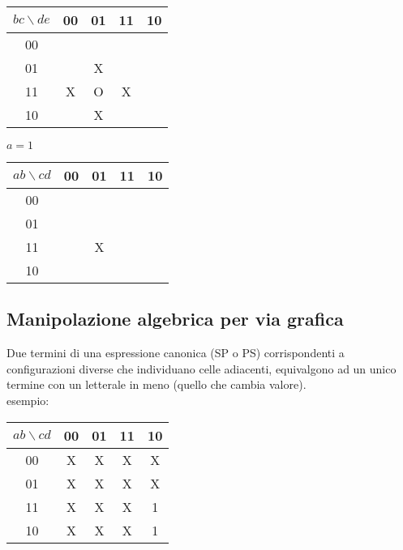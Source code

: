 \documentclass{subfiles}
\begin{document}
\begin{itemize}
    \begin{center}
    \begin{tabular}{ |c|c|c|c|c| }
    \hline
    $bc \backslash de$ & 00 & 01 & 11 & 10 \\
    \hline
    \hline
    00 & & & & \\
    01 & & X & & \\
    11 & X & O & X & \\
    10 & & X & & \\
    \hline
    \end{tabular}
    \end{center}

    $a=1$

    \begin{center}
    \begin{tabular}{ |c|c|c|c|c| }
    \hline
    $ab \backslash cd$ & 00 & 01 & 11 & 10 \\
    \hline
    \hline
    00 & & & & \\
    01 & & & & \\
    11 & & X & & \\
    10 & & & & \\
    \hline
    \end{tabular}
    \end{center}
\end{itemize}

\subsection{Manipolazione algebrica per via grafica}

Due termini di una espressione canonica (SP o PS) corrispondenti a configurazioni diverse che individuano celle adiacenti,
equivalgono ad un unico termine con un letterale in meno (quello che cambia valore).\\

\noindent
esempio:

\begin{center}
\begin{tabular}{ |c|c|c|c|c| }
\hline
$ab \backslash cd$ & 00 & 01 & 11 & 10 \\
\hline
\hline
00 & X & X & X & X \\
01 & X & X & X & X \\
11 & X & X & X & 1 \\
10 & X & X & X & 1 \\
\hline
\end{tabular}
\end{center}
\end{document}
